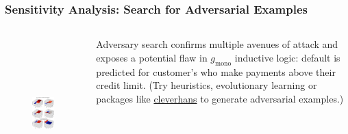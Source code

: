 \documentclass[11pt,
               aspectratio=169,
               hyperref={colorlinks}
               ]{beamer}
\begin{document}
			\begin{frame}[t, allowframebreaks]
				\vspace{-10pt}
				\frametitle{\textbf{Sensitivity Analysis}: Search for Adversarial Examples}
				
				\begin{columns}		
				
				
					\begin{figure}
						\begin{center}
							\includegraphics[height=165pt]{../img/sa_max_prob.png}
						\end{center}
					\end{figure}
			
					\small{Adversary search confirms multiple avenues of attack and exposes a potential flaw in $g_{\text{mono}}$ inductive logic: default is predicted for customer's who make payments above their credit limit. (Try heuristics, evolutionary learning or packages like \href{https://github.com/tensorflow/cleverhans}{cleverhans} to generate adversarial examples.)}
				
				\end{columns}
					
		
			\end{frame}			
			
\end{document}
